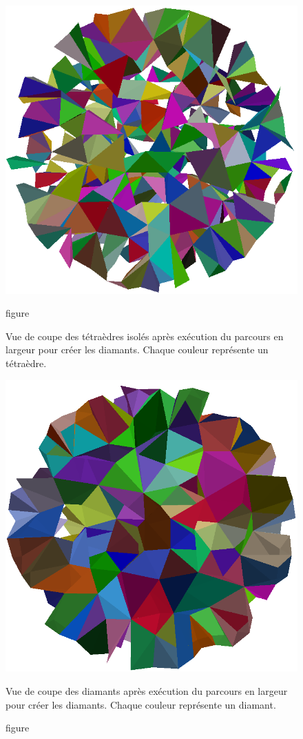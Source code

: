 \documentclass[a4paper,11pt,openany]{article}
\begin{document}
\begin{figure}[H]
\centering
\begin{minipage}{.5\textwidth}
  \centering
  \includegraphics[scale=0.2]{Images/isolated_tetra}
  \caption{figure}{Vue de coupe des tétraèdres isolés après exécution du parcours en largeur pour créer les diamants. Chaque couleur représente un tétraèdre.}
  \label{fig:isolated_tetra}
\end{minipage}%
\begin{minipage}{.5\textwidth}
  \centering
  \includegraphics[scale=0.16]{Images/diamond}
  \caption{figure}{Vue de coupe des diamants après exécution du parcours en largeur pour créer les diamants. Chaque couleur représente un diamant.}
  \label{fig:diamond}
\end{minipage}
\end{figure}
\end{document}
